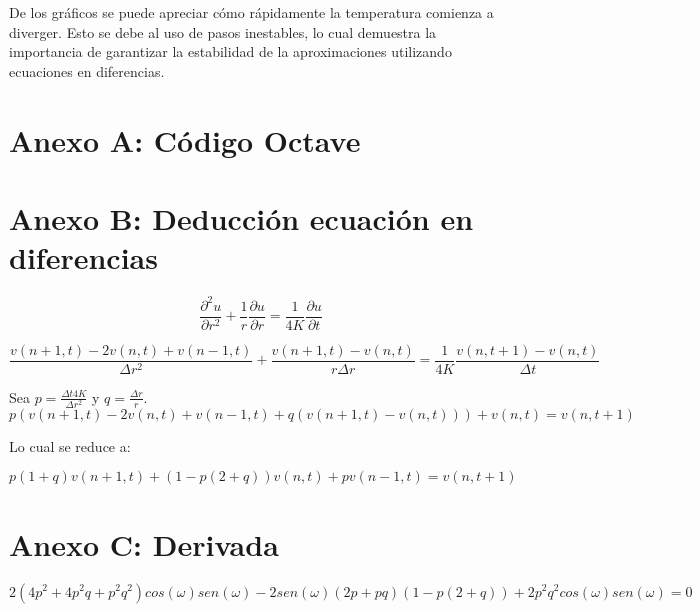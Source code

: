 ﻿\documentclass[%
final,
%
reprint,
%
notitlepage,
narroweqnarray,
inline,
twoside,
invited
]{ieee}
\begin{document}
\par De los gráficos se puede apreciar cómo rápidamente la temperatura comienza a diverger. Esto se debe 
al uso de pasos inestables, lo cual demuestra la importancia de garantizar la estabilidad de la aproximaciones 
utilizando ecuaciones en diferencias.

\begin{thebibliography}{1}



\end{thebibliography}




\clearpage

\onecolumn

\section*{Anexo A: Código Octave}


\section*{Anexo B: Deducción ecuación en diferencias}

\begin{equation}
\frac{\partial^2 u}{\partial r^2}+\frac{1}{r}\frac{\partial u}{\partial r}=\frac{1}{4K}\frac{\partial u}{\partial t}
\end{equation}

\[ \frac{v(n+1,t) - 2v(n,t) + v(n-1,t)}{\Delta r^2} + \frac{v(n+1,t) - v(n,t)}{r\Delta r} = \frac{1}{4K}\frac{v(n,t+1) - v(n,t)}{\Delta t} \]

Sea $p=\frac{\Delta t4K}{\Delta r^2}$ y $q=\frac{\Delta r}{r}$.
\[ p\left( v(n+1,t) - 2v(n,t) + v(n-1,t) + q\left( v(n+1,t) - v(n,t)\right)\right) + v(n,t) = v(n, t+1) \]

Lo cual se reduce a:

\begin{equation}
p(1+q)v(n+1,t) + (1-p(2+q))v(n,t) + pv(n-1,t) = v(n,t+1)
\end{equation}

\section*{Anexo C: Derivada}

\[
2(4p^2+4p^2q+p^2q^2) cos(\omega)sen(\omega) - 2sen(\omega)(2p+pq)(1-p(2+q))+2p^2q^2cos(\omega)sen(\omega) = 0
\]
\end{document}
